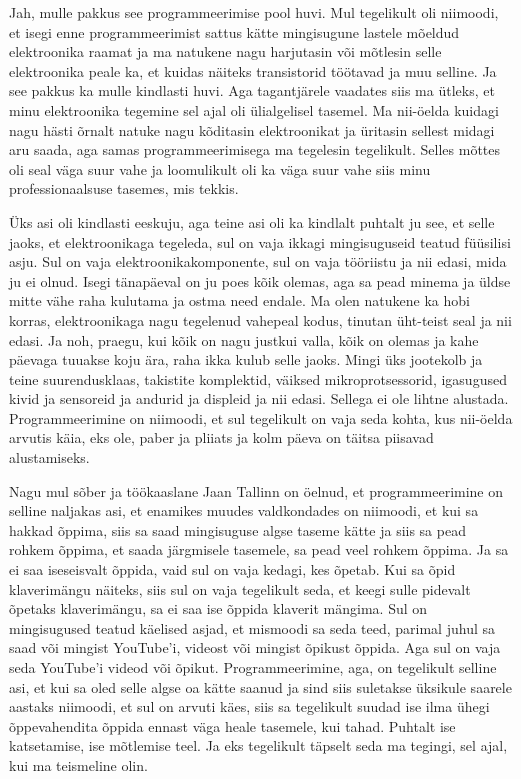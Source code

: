
Jah, mulle pakkus see programmeerimise pool huvi. Mul tegelikult oli niimoodi, 
et isegi enne programmeerimist sattus kätte mingisugune lastele mõeldud 
elektroonika raamat ja ma  natukene nagu harjutasin või mõtlesin selle 
elektroonika peale ka, et kuidas näiteks transistorid töötavad ja muu selline. 
Ja see pakkus ka mulle kindlasti huvi. Aga tagantjärele vaadates siis ma 
ütleks, et minu elektroonika tegemine sel ajal oli  ülialgelisel tasemel. Ma 
nii-öelda  kuidagi nagu hästi õrnalt natuke nagu kõditasin elektroonikat ja 
üritasin sellest midagi aru saada, aga samas programmeerimisega ma tegelesin  
tegelikult. Selles mõttes oli seal väga suur vahe ja loomulikult oli ka väga 
suur vahe siis minu  professionaalsuse tasemes, mis  tekkis.


Üks asi oli kindlasti eeskuju, aga teine asi oli ka kindlalt puhtalt ju see, et 
selle jaoks, et elektroonikaga tegeleda, sul on vaja ikkagi mingisuguseid 
teatud füüsilisi asju. Sul on vaja elektroonikakomponente, sul on vaja 
tööriistu ja nii edasi, mida ju ei olnud. Isegi tänapäeval on ju poes  kõik 
olemas, aga sa pead minema ja üldse mitte vähe raha kulutama ja ostma need 
endale. Ma olen natukene ka hobi korras, elektroonikaga nagu tegelenud vahepeal 
kodus, tinutan üht-teist seal ja nii edasi. Ja noh, praegu, kui kõik on nagu 
justkui valla, kõik on olemas ja kahe päevaga tuuakse koju ära, raha ikka kulub 
selle jaoks. Mingi  üks jootekolb ja teine suurendusklaas, takistite 
komplektid, väiksed mikroprotsessorid, igasugused kivid ja sensoreid ja andurid 
ja displeid ja nii edasi. Sellega ei ole lihtne alustada. Programmeerimine on 
niimoodi, et sul tegelikult on vaja seda kohta, kus nii-öelda arvutis käia, eks 
ole, paber ja pliiats ja kolm päeva on täitsa piisavad alustamiseks.

Nagu mul sõber ja töökaaslane Jaan Tallinn on  
öelnud, et programmeerimine on selline naljakas asi, et  enamikes muudes  
valdkondades on niimoodi, et kui sa hakkad   õppima, siis sa saad mingisuguse 
algse  taseme kätte ja siis sa pead rohkem õppima, et saada järgmisele 
tasemele,  sa pead veel rohkem õppima. Ja sa ei saa iseseisvalt õppida, vaid 
sul on vaja kedagi, kes õpetab. Kui sa õpid klaverimängu näiteks, siis sul on 
vaja tegelikult seda, et keegi sulle pidevalt õpetaks  klaverimängu, sa ei saa 
ise õppida klaverit mängima. Sul on mingisugused teatud käelised asjad, et 
mismoodi sa seda teed, parimal juhul sa saad või mingist YouTube'i, videost või 
mingist õpikust õppida. Aga sul on vaja seda YouTube'i videod või õpikut. 
Programmeerimine, aga, on tegelikult selline asi, et kui sa oled selle algse oa 
kätte saanud ja sind siis suletakse üksikule saarele aastaks niimoodi, et sul 
on arvuti käes, siis sa tegelikult suudad ise ilma ühegi õppevahendita õppida 
ennast väga heale tasemele, kui tahad. Puhtalt ise katsetamise,  ise mõtlemise  
teel. Ja eks tegelikult täpselt seda ma tegingi, sel ajal, kui ma teismeline 
olin.

